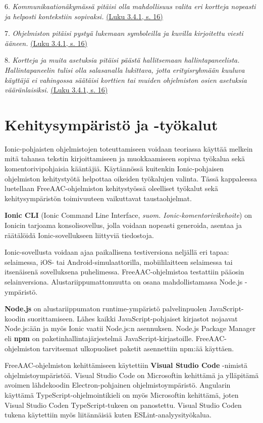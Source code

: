 \documentclass[utf8]{gradu3}
\begin{document}
6. \textit{Kommunikaationäkymässä pitäisi olla mahdollisuus valita eri kortteja nopeasti ja helposti kontekstiin sopivaksi.} \hyperref[AAC-cardsize]{(Luku 3.4.1, s. 16)}

7. \textit{Ohjelmiston pitäisi pystyä lukemaan symboleilla ja kuvilla kirjoitettu viesti ääneen.} \hyperref[AAC-soundsynth]{(Luku 3.4.1, s. 16)}

8. \textit{Kortteja ja muita asetuksia pitäisi päästä hallitsemaan hallintapaneelista. Hallintapaneelin tulisi olla salasanalla lukittava, jotta erityisryhmään kuuluva käyttäjä ei vahingossa säätäisi korttien tai muiden ohjelmiston osien asetuksia vääränlaisiksi.} \hyperref[AAC-settings]{(Luku 3.4.1, s. 16)}

\section{Kehitysympäristö ja -työkalut}

Ionic-pohjaisten ohjelmistojen toteuttamiseen voidaan teoriassa käyttää melkein mitä tahansa tekstin kirjoittamiseen ja muokkaamiseen sopivaa työkalua sekä komentorivipohjaisia kääntäjiä. Käytännössä kuitenkin Ionic-pohjaisen ohjelmiston kehitystyötä helpottaa oikeiden työkalujen valinta. Tässä kappaleessa luetellaan FreeAAC-ohjelmiston kehitystyössä oleelliset työkalut sekä kehitysympäristön toimivuuteen vaikuttavat taustaohjelmat.

\textbf{Ionic CLI} (Ionic Command Line Interface, \textit{suom. Ionic-komentorivikehoite}) on Ionicin tarjoama konsolisovellus, jolla voidaan nopeasti generoida, asentaa ja räätälöidä Ionic-sovellukseen liittyviä tiedostoja.

Ionic-sovellusta voidaan ajaa paikallisena testiversiona neljällä eri tapaa: selaimessa, iOS- tai Android-simulaattorilla, mobiililaitteen selaimessa tai itsenäisenä sovelluksena puhelimessa. FreeAAC-ohjelmistoa testattiin pääosin selainversiona. Alustariippumattomuutta on osana mahdollistamassa Node.js -ympäristö.

\textbf{Node.js} on alustariippumaton runtime-ympäristö palvelinpuolen JavaScript-koodin suorittamiseen. Lähes kaikki JavaScript-pohjaiset kirjastot nojaavat Node.js:ään ja myös Ionic vaatii Node.js:n asennuksen. Node.js Package Manager eli \textbf{npm} on paketinhallintajärjestelmä JavaScript-kirjastoille. FreeAAC-ohjelmiston tarvitsemat ulkopuoliset paketit asennettiin npm:ää käyttäen.

FreeAAC-ohjelmiston kehittämiseen käytettiin \textbf{Visual Studio Code} -nimistä ohjelmistoympäristöä. Visual Studio Code on Microsoftin kehittämä ja ylläpitämä avoimen lähdekoodin Electron-pohjainen ohjelmistoympäristö. Angularin käyttämä TypeScript-ohjelmointikieli on myös Microsoftin kehittämä, joten Visual Studio Coden TypeScript-tukeen on panostettu. Visual Studio Coden tukena käytettiin myös liitännäisiä kuten ESLint-analyysityökalua.
\end{document}

